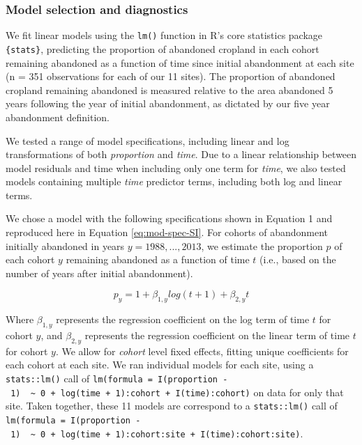 \documentclass[
]{article}
\begin{document}
\hypertarget{model-selection-and-diagnostics}{%
\subsubsection{Model selection and diagnostics}\label{model-selection-and-diagnostics}}

We fit linear models using the \texttt{lm()} function in R's core statistics package \texttt{\{stats\}}, predicting the proportion of abandoned cropland in each cohort remaining abandoned as a function of time since initial abandonment at each site (n = 351 observations for each of our 11 sites).
The proportion of abandoned cropland remaining abandoned is measured relative to the area abandoned 5 years following the year of initial abandonment, as dictated by our five year abandonment definition.

We tested a range of model specifications, including linear and log transformations of both \emph{proportion} and \emph{time}.
Due to a linear relationship between model residuals and time when including only one term for \emph{time}, we also tested models containing multiple \emph{time} predictor terms, including both log and linear terms.

We chose a model with the following specifications shown in Equation 1 and reproduced here in Equation \eqref{eq:mod-spec-SI}.
For cohorts of abandonment initially abandoned in years \(y = 1988, ... , 2013\), we estimate the proportion \(p\) of each cohort \(y\) remaining abandoned as a function of time \(t\) (i.e., based on the number of years after initial abandonment).

\begin{equation}
p_{y} = 1 + \beta_{1,y} log(t + 1) + \beta_{2,y} t \label{eq:mod-spec-SI}
\end{equation}

Where \(\beta_{1,y}\) represents the regression coefficient on the log term of time \(t\) for cohort \(y\), and \(\beta_{2,y}\) represents the regression coefficient on the linear term of time \(t\) for cohort \(y\).
We allow for \emph{cohort} level fixed effects, fitting unique coefficients for each cohort at each site.
We ran individual models for each site, using a \texttt{stats::lm()} call of \texttt{lm(formula\ =\ I(proportion\ -\ 1)\ \ \textasciitilde{}\ 0\ +\ log(time\ +\ 1):cohort\ +\ I(time):cohort)} on data for only that site.
Taken together, these 11 models are correspond to a \texttt{stats::lm()} call of \texttt{lm(formula\ =\ I(proportion\ -\ 1)\ \ \textasciitilde{}\ 0\ +\ log(time\ +\ 1):cohort:site\ +\ I(time):cohort:site)}.
\end{document}
